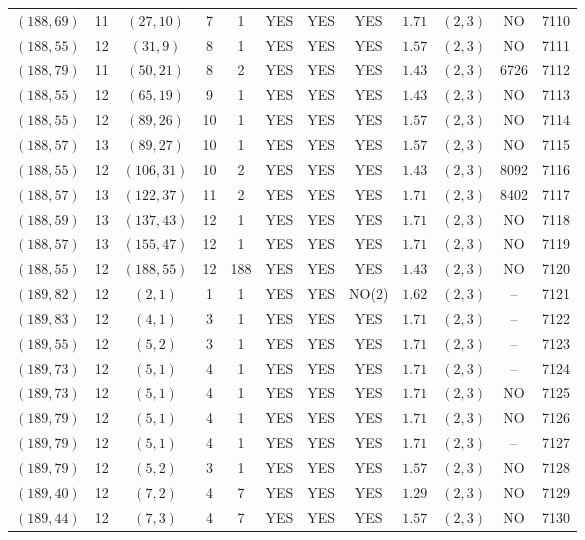 \begin{longtable}{|c|c|c|c|c|c|c|c|c|c|c|c|}
$(188,69)$ & 11 & $(27,10)$ & 7 & 1 & YES & YES & YES & $1.71$ & $(2,3)$ & NO & 7110\\
$(188,55)$ & 12 & $(31,9)$ & 8 & 1 & YES & YES & YES & $1.57$ & $(2,3)$ & NO & 7111\\
$(188,79)$ & 11 & $(50,21)$ & 8 & 2 & YES & YES & YES & $1.43$ & $(2,3)$ & 6726 & 7112\\
$(188,55)$ & 12 & $(65,19)$ & 9 & 1 & YES & YES & YES & $1.43$ & $(2,3)$ & NO & 7113\\
$(188,55)$ & 12 & $(89,26)$ & 10 & 1 & YES & YES & YES & $1.57$ & $(2,3)$ & NO & 7114\\
$(188,57)$ & 13 & $(89,27)$ & 10 & 1 & YES & YES & YES & $1.57$ & $(2,3)$ & NO & 7115\\
$(188,55)$ & 12 & $(106,31)$ & 10 & 2 & YES & YES & YES & $1.43$ & $(2,3)$ & 8092 & 7116\\
$(188,57)$ & 13 & $(122,37)$ & 11 & 2 & YES & YES & YES & $1.71$ & $(2,3)$ & 8402 & 7117\\
$(188,59)$ & 13 & $(137,43)$ & 12 & 1 & YES & YES & YES & $1.71$ & $(2,3)$ & NO & 7118\\
$(188,57)$ & 13 & $(155,47)$ & 12 & 1 & YES & YES & YES & $1.71$ & $(2,3)$ & NO & 7119\\
$(188,55)$ & 12 & $(188,55)$ & 12 & 188 & YES & YES & YES & $1.43$ & $(2,3)$ & NO & 7120\\
$(189,82)$ & 12 & $(2,1)$ & 1 & 1 & YES & YES & NO(2) & $1.62$ & $(2,3)$ & -- & 7121\\
$(189,83)$ & 12 & $(4,1)$ & 3 & 1 & YES & YES & YES & $1.71$ & $(2,3)$ & -- & 7122\\
$(189,55)$ & 12 & $(5,2)$ & 3 & 1 & YES & YES & YES & $1.71$ & $(2,3)$ & -- & 7123\\
$(189,73)$ & 12 & $(5,1)$ & 4 & 1 & YES & YES & YES & $1.71$ & $(2,3)$ & -- & 7124\\
$(189,73)$ & 12 & $(5,1)$ & 4 & 1 & YES & YES & YES & $1.71$ & $(2,3)$ & NO & 7125\\
$(189,79)$ & 12 & $(5,1)$ & 4 & 1 & YES & YES & YES & $1.71$ & $(2,3)$ & NO & 7126\\
$(189,79)$ & 12 & $(5,1)$ & 4 & 1 & YES & YES & YES & $1.71$ & $(2,3)$ & -- & 7127\\
$(189,79)$ & 12 & $(5,2)$ & 3 & 1 & YES & YES & YES & $1.57$ & $(2,3)$ & NO & 7128\\
$(189,40)$ & 12 & $(7,2)$ & 4 & 7 & YES & YES & YES & $1.29$ & $(2,3)$ & NO & 7129\\
$(189,44)$ & 12 & $(7,3)$ & 4 & 7 & YES & YES & YES & $1.57$ & $(2,3)$ & NO & 7130\\

\end{longtable}
